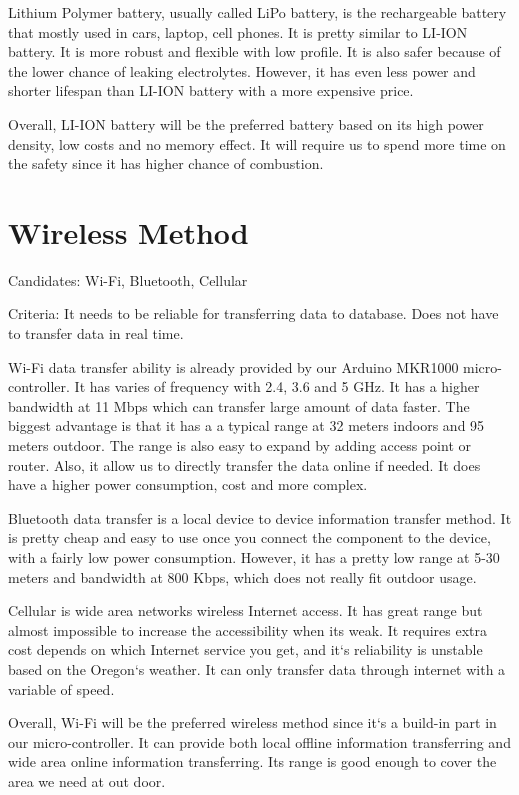 \documentclass[letterpaper,10pt,titlepage]{article}
\begin{document}
Lithium Polymer battery, usually called LiPo battery, is the rechargeable battery that mostly used in cars, laptop, cell phones. It is pretty similar to LI-ION battery. It is more robust and flexible with low profile. It is also safer because of the lower chance of leaking electrolytes. However, it has even less power and shorter lifespan than LI-ION battery with a more expensive price.

Overall, LI-ION battery will be the preferred battery based on its high power density, low costs and no memory effect. It will require us to spend more time on the safety since it has higher chance of combustion. 

\section{Wireless Method}

Candidates: Wi-Fi, Bluetooth, Cellular

Criteria: It needs to be reliable for transferring data to database. Does not have to transfer data in real time.

Wi-Fi data transfer ability is already provided by our Arduino MKR1000 micro-controller. It has varies of frequency with 2.4, 3.6 and 5 GHz. It has a higher bandwidth at 11 Mbps which can transfer large amount of data faster. The biggest advantage is that it has a a typical range at 32 meters indoors and 95 meters outdoor. The range is also easy to expand by adding access point or router. Also, it allow us to directly transfer the data online if needed. It does have a higher power consumption, cost and more complex.     

Bluetooth data transfer is a local device to device information transfer method. It is pretty cheap and easy to use once you connect the component to the device, with a fairly low power consumption. However, it has a pretty low range at 5-30 meters and bandwidth at 800 Kbps, which does not really fit outdoor usage. 

Cellular is wide area networks wireless Internet access. It has great range but almost impossible to increase the accessibility when its weak. It requires extra cost depends on which Internet service you get, and it`s reliability is unstable based on the Oregon`s weather. It can only transfer data through internet with a variable of speed.

Overall, Wi-Fi will be the preferred wireless method since it`s a build-in part in our micro-controller. It can provide both local offline information transferring and wide area online information transferring. Its range is good enough to cover the area we need at out door.
\end{document}
